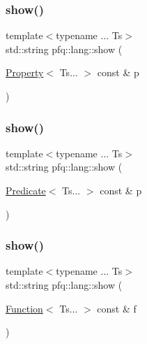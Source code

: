 \mbox{\label{namespacepfq_1_1lang_a94bf1496c888adfd3d99e25895ed6df8}} 
\subsubsection{\texorpdfstring{show()}{show()}\hspace{0.1cm}{\footnotesize\ttfamily [5/8]}}
{\footnotesize\ttfamily template$<$typename ... Ts$>$ \\
std\+::string pfq\+::lang\+::show (\begin{DoxyParamCaption}\item[{\hyperlink{structpfq_1_1lang_1_1Property}{Property}$<$ Ts... $>$ const \&}]{p }\end{DoxyParamCaption})\hspace{0.3cm}{\ttfamily [inline]}}

\mbox{\label{namespacepfq_1_1lang_a42c749f45910e4c14d412cc3db5791e5}} 
\subsubsection{\texorpdfstring{show()}{show()}\hspace{0.1cm}{\footnotesize\ttfamily [6/8]}}
{\footnotesize\ttfamily template$<$typename ... Ts$>$ \\
std\+::string pfq\+::lang\+::show (\begin{DoxyParamCaption}\item[{\hyperlink{structpfq_1_1lang_1_1Predicate}{Predicate}$<$ Ts... $>$ const \&}]{p }\end{DoxyParamCaption})\hspace{0.3cm}{\ttfamily [inline]}}

\mbox{\label{namespacepfq_1_1lang_adb5a6dd5a3af8c170720c866a7839daa}} 
\subsubsection{\texorpdfstring{show()}{show()}\hspace{0.1cm}{\footnotesize\ttfamily [7/8]}}
{\footnotesize\ttfamily template$<$typename ... Ts$>$ \\
std\+::string pfq\+::lang\+::show (\begin{DoxyParamCaption}\item[{\hyperlink{structpfq_1_1lang_1_1Function}{Function}$<$ Ts... $>$ const \&}]{f }\end{DoxyParamCaption})\hspace{0.3cm}{\ttfamily [inline]}}

